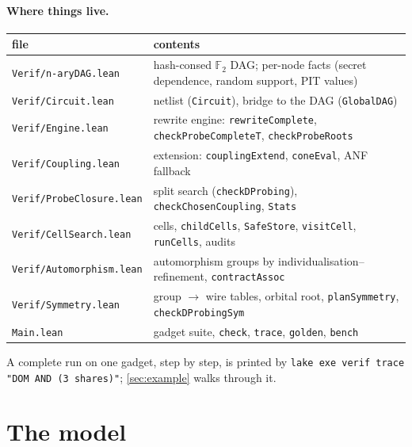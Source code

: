 \documentclass[11pt,a4paper]{article}
\theoremstyle{definition}
\theoremstyle{remark}
\newcommand{\code}[1]{\texttt{\small #1}}
\newcommand{\F}{\mathbb{F}_2}
\begin{document}
\paragraph{Where things live.}
\begin{center}\small
\begin{tabular}{@{}lp{9.6cm}@{}}
\toprule
file & contents \\
\midrule
\code{Verif/n-aryDAG.lean} & hash-consed $\F$ DAG; per-node facts (secret dependence, random support, PIT values)\\
\code{Verif/Circuit.lean} & netlist (\code{Circuit}), bridge to the DAG (\code{GlobalDAG})\\
\code{Verif/Engine.lean} & rewrite engine: \code{rewriteComplete}, \code{checkProbeCompleteT}, \code{checkProbeRoots}\\
\code{Verif/Coupling.lean} & extension: \code{couplingExtend}, \code{coneEval}, ANF fallback\\
\code{Verif/ProbeClosure.lean} & split search (\code{checkDProbing}), \code{checkChosenCoupling}, \code{Stats}\\
\code{Verif/CellSearch.lean} & cells, \code{childCells}, \code{SafeStore}, \code{visitCell}, \code{runCells}, audits\\
\code{Verif/Automorphism.lean} & automorphism groups by individualisation--refinement, \code{contractAssoc}\\
\code{Verif/Symmetry.lean} & group $\to$ wire tables, orbital root, \code{planSymmetry}, \code{checkDProbingSym}\\
\code{Main.lean} & gadget suite, \code{check}, \code{trace}, \code{golden}, \code{bench}\\
\bottomrule
\end{tabular}
\end{center}

A complete run on one gadget, step by step, is printed by
\code{lake exe verif trace "DOM AND (3 shares)"}; \cref{sec:example} walks through it.

\section{The model}\label{sec:model}
\end{document}

